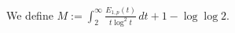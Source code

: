 \begin{definition}
\label{Meissel-Mertens-constant}
\leanok
We define $M := \int_2^\infty \frac{E_{1,p}(t)}{t \log^2 t} \, dt + 1 - \log \log 2$.
\end{definition}
